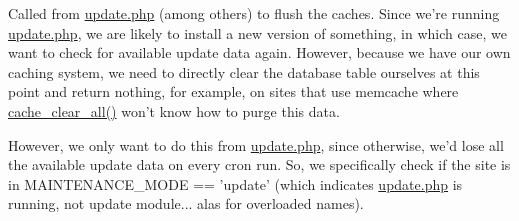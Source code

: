 Called from \hyperlink{update_8php}{update.php} (among others) to flush the caches. Since we're running \hyperlink{update_8php}{update.php}, we are likely to install a new version of something, in which case, we want to check for available update data again. However, because we have our own caching system, we need to directly clear the database table ourselves at this point and return nothing, for example, on sites that use memcache where \hyperlink{includes_2cache_8inc_a409b34dd629640d791a11736a9de8125}{cache\_\-clear\_\-all()} won't know how to purge this data.

However, we only want to do this from \hyperlink{update_8php}{update.php}, since otherwise, we'd lose all the available update data on every cron run. So, we specifically check if the site is in MAINTENANCE\_\-MODE == 'update' (which indicates \hyperlink{update_8php}{update.php} is running, not update module... alas for overloaded names). 